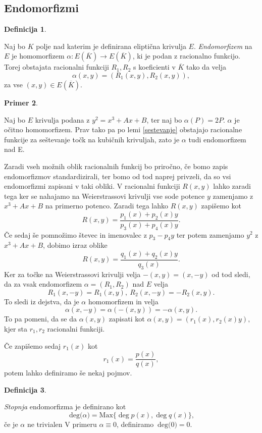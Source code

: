 \documentclass[12pt,a4paper,twoside]{article}
\theoremstyle{definition} %
\newtheorem{definicija}{Definicija}[section]
\newtheorem{primer}[definicija]{Primer}
\theoremstyle{plain} %
\numberwithin{equation}{section}  %
\newcommand{\E}[1]{E({#1})}
\newcommand{\DEG}[1]{\ \text{deg(}{#1}\text{)}}
\begin{document}
\subsection{Endomorfizmi}

\begin{definicija}~

Naj bo $K$ polje nad katerim je definirana eliptična krivulja $E$.
\emph{Endomorfizem} na $E$ je homomorfizem $\alpha: \E{\overline{K}} \rightarrow \E{\overline{K}} $, ki je podan z racionalno funkcijo. Torej obstajata racionalni funkciji $R_1,R_2$ s koeficienti v $\overline{K}$ tako da velja
$$\alpha(x,y) = (R_1(x,y),R_2(x,y)),$$
za vse $(x,y) \in \E{\overline{K}}$.
\end{definicija}

\begin{primer}~

Naj bo $E$ krivulja podana z $y^2 = x^3+Ax+B$, ter naj bo $\alpha(P) = 2P$. $\alpha$ je očitno homomorfizem. Prav tako pa po lemi \ref{sestevanje} obstajajo racionalne funkcije za seštevanje točk na kubičnih krivuljah, zato je $\alpha$ tudi endomorfizem nad E.
\end{primer}

Zaradi vseh možnih oblik racionalnih funkcij bo priročno, če bomo zapis endomorfizmov standardizirali, ter bomo od tod naprej privzeli, da so vsi endomorfizmi zapisani v taki obliki.
V racionalni funkciji $R(x,y)$ lahko zaradi tega ker se nahajamo na Weierstrassovi krivulji vse sode potence $y$ zamenjamo z $x^3+Ax+B$ na primerno potenco. Zaradi tega lahko $R(x,y)$ zapišemo kot
$$R(x,y) = \frac{p_1(x)+p_2(x)y}{p_3(x)+p_4(x)y}.$$
Če sedaj še pomnožimo števec in imenovalec z $p_3-p_4y$ ter potem zamenjamo $y^2$ z $x^3+Ax+B$, dobimo izraz oblike
$$R(x,y) = \frac{q_1(x)+q_2(x)y}{q_3(x)}.$$
Ker za točke na Weierstrassovi krivulji velja $-(x,y) = (x,-y)$ od tod sledi, da za vsak endomorfizem $\alpha = (R_1,R_2) $ nad $E$ velja
$$R_1(x,-y) = R_1(x,y), \ R_2(x,-y) = -R_2(x,y).$$
To sledi iz dejstva, da je $\alpha$ homomorfizem in velja
$$\alpha(x,-y) = \alpha(-(x,y)) = -\alpha(x,y).$$
To pa pomeni, da se da $\alpha(x,y)$ zapisati kot
$\alpha(x,y) = (r_1(x),r_2(x)y),$
kjer sta $r_1,r_2$ racionalni funkciji.

Če zapišemo sedaj $r_1(x)$ kot
$$r_1(x) = \frac{p(x)}{q(x)},$$
potem lahko definiramo še nekaj pojmov. 

\begin{definicija}~

\emph{Stopnja} endomorfizma je  definirano kot
$$\DEG{\alpha} = \text{Max} \{ \deg{p(x)},\deg{q(x)} \},$$
če je $\alpha$ ne trivialen V primeru $\alpha \equiv 0$, definiramo $\DEG{0} = 0$.
\end{definicija}
\end{document}
